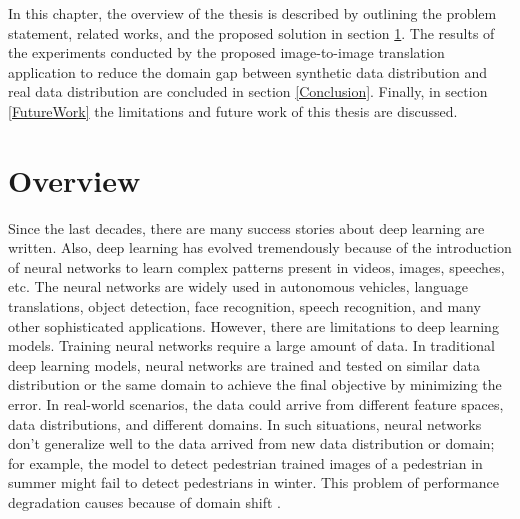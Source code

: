 \justifying
\setlength{\parskip}{1em}



In this chapter, the overview of the thesis is described by outlining the problem statement, related works, and the proposed solution in section \ref{Overview}. The results of the experiments conducted by the proposed image-to-image translation application to reduce the domain gap between synthetic data distribution and real data distribution are concluded in section \ref{Conclusion}. Finally, in section \ref{FutureWork} the limitations and future work of this thesis are discussed.


\section{Overview}\label{Overview}

Since the last decades, there are many success stories about deep learning are written. Also, deep learning has evolved tremendously because of the introduction of neural networks to learn complex patterns present in videos, images, speeches, etc. The neural networks are widely used in autonomous vehicles, language translations, object detection, face recognition, speech recognition, and many other sophisticated applications. However, there are limitations to deep learning models. Training neural networks require a large amount of data. In traditional deep learning models, neural networks are trained and tested on similar data distribution or the same domain to achieve the final objective by minimizing the error. In real-world scenarios, the data could arrive from different feature spaces, data distributions, and different domains. In such situations, neural networks don't generalize well to the data arrived from new data distribution or domain; for example, the model to detect pedestrian trained images of a pedestrian in summer might fail to detect pedestrians in winter. This problem of performance degradation causes because of domain shift \cite{farahani2020brief}. 


